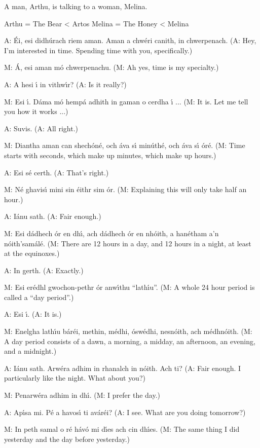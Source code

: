 A man, Arthu, is talking to a woman, Melina.

Arthu = The Bear < Artos
Melina = The Honey < Melina

A: \'{E}i, esi didh\'{u}rach riem aman. Aman a chw\'{e}ri canith, in chwerpenach.
(A: Hey, I’m interested in time. Spending time with you, specifically.)

M: \'{A}, esi aman m\'{o} chwerpenachu. 
(M: Ah yes, time is my specialty.)

A: A hesi \'{\i} in vithw\'{\i}r?
(A: Is it really?)

M: Esi \'{\i}. D\'{a}ma m\'{o} hemp\'{a} adhith in gaman o cerdha \'{\i} ...
(M: It is. Let me tell you how it works ...)

A: Suvis.
(A: All right.)

M: Diantha aman can shech\'{o}n\'{e}, och \'{a}va s\'{\i} min\'{u}th\'{e}, och \'{a}va s\'{\i} \'{o}r\'{e}.
(M: Time starts with seconds, which make up minutes, which make up hours.)

A: Esi s\'{e} certh.
(A: That’s right.)

M: N\'{e} ghavis\'{\i} mini sin \'{e}ithr sim \'{o}r.
(M: Explaining this will only take half an hour.)

A: I\'{a}nu sath.
(A: Fair enough.)

M: Esi d\'{a}dhech \'{o}r en dh\'{\i}, ach d\'{a}dhech \'{o}r en nh\'{o}ith, a han\'{e}tham a’n n\'{o}ith’sam\'{a}l\'{e}.
(M: There are 12 hours in a day, and 12 hours in a night, at least at the equinoxes.)

A: In gerth.
(A: Exactly.)

M: Esi er\'{e}dhl gwochon-pethr \'{o}r anw\'{\i}thu ``lath\'{\i}u''.
(M: A whole 24 hour period is called a ``day period''.)

A: Esi \'{\i}.
(A: It is.)

M: Enelgha lath\'{\i}u b\'{a}r\'{e}i, methin, m\'{e}dhi, \'{o}sw\'{e}dhi, nesn\'{o}ith, ach m\'{e}dhn\'{o}ith.
(M: A day period consists of a dawn, a morning, a midday, an afternoon, an evening, and a midnight.)

A: I\'{a}nu sath. Arw\'{e}ra adhim in rhanalch in n\'{o}ith. Ach ti?
(A: Fair enough. I particularly like the night. What about you?)

M: Penarw\'{e}ra adhim in dh\'{\i}.
(M: I prefer the day.)

A: Ap\'{\i}sa mi. P\'{e} a havos\'{\i} ti av\'{a}r\'{e}i?
(A: I see. What are you doing tomorrow?)

M: In peth samal o r\'{e} h\'{a}v\'{o} mi d\'{\i}es ach cin dh\'{\i}es.
(M: The same thing I did yesterday and the day before yesterday.)

